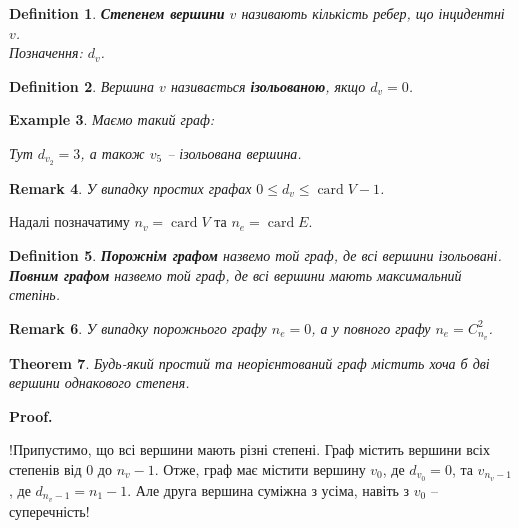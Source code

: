 \documentclass[a4paper, 14pt]{extarticle}
\makeatletter
\theoremstyle{theoremdd}
\newtheorem{theorem}{Theorem}[subsection]
\theoremstyle{theoremdd}
\newtheorem{definition}[theorem]{Definition}
\theoremstyle{theoremdd}
\theoremstyle{theoremdd}
\theoremstyle{theoremdd}
\newtheorem{example}[theorem]{Example}
\theoremstyle{theoremdd}
\theoremstyle{theoremdd}
\theoremstyle{theoremdd}
\theoremstyle{theoremdd}
\theoremstyle{theoremdd}
\theoremstyle{theoremdd}
\newtheorem{remark}[theorem]{Remark}
\theoremstyle{theoremdd}
\theoremstyle{theoremdd}
\theoremstyle{theoremdd}
\theoremstyle{theoremdd}
\renewenvironment{proof}[1][Proof.\\]{\par
\pushQED{\hfill \qed}%
\normalfont \topsep6\p@\@plus6\p@\relax
\trivlist
\item\relax
{\bfseries
#1\@addpunct{.}}\hspace\labelsep\ignorespaces
}{%
\popQED\endtrivlist\@endpefalse
}
\DeclareMathOperator{\card}{card}
\makeatother
\begin{document}
\begin{definition}
\textbf{Степенем вершини} $v$ називають кількість ребер, що інцидентні $v$.\\
Позначення: $d_v$.
\end{definition}

\begin{definition}
Вершина $v$ називається \textbf{ізольованою}, якщо $d_v = 0$.
\end{definition}

\begin{example}
Маємо такий граф:
\begin{figure}[H]
\centering
{}
\end{figure}
Тут $d_{v_2} = 3$, а також $v_5$ -- ізольована вершина.
\end{example}

\begin{remark}
У випадку простих графах $0 \leq d_v \leq \card V -1$.
\end{remark}

Надалі позначатиму $n_v = \card V$ та $n_e = \card E$.

\begin{definition}
\textbf{Порожнім графом} назвемо той граф, де всі вершини ізольовані. \textbf{Повним графом} назвемо той граф, де всі вершини мають максимальний степінь.
\end{definition}

\begin{remark}
У випадку порожнього графу $n_e= 0$, а у повного графу $n_e = C_{n_v}^2$.
\end{remark}

\begin{theorem}
Будь-який простий та неорієнтований граф містить хоча б дві вершини однакового степеня.
\end{theorem}

\begin{proof}
!Припустимо, що всі вершини мають різні степені. Граф містить вершини всіх степенів від $0$ до $n_v - 1$. Отже, граф має містити вершину $v_0$, де $d_{v_0} = 0$, та $v_{n_v-1}$, де $d_{n_v-1} = n_1-1$. Але друга вершина суміжна з усіма, навіть з $v_0$ -- суперечність!
\end{proof}
\end{document}
